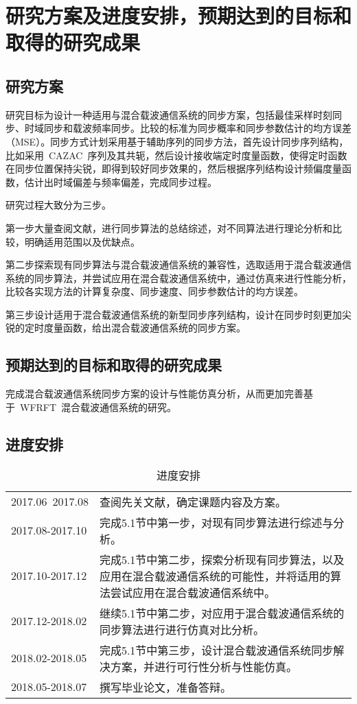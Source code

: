 
\section{研究方案及进度安排，预期达到的目标和取得的研究成果}
\subsection{研究方案}
研究目标为设计一种适用与混合载波通信系统的同步方案，包括最佳采样时刻同步、时域同步和载波频率同步。比较的标准为同步概率和同步参数估计的均方误差（MSE）。同步方式计划采用基于辅助序列的同步方法，首先设计同步序列结构，比如采用~CAZAC~序列及其共轭，然后设计接收端定时度量函数，使得定时函数在同步位置保持尖锐，即得到较好同步效果的，然后根据序列结构设计频偏度量函数，估计出时域偏差与频率偏差，完成同步过程。

研究过程大致分为三步。

第一步大量查阅文献，进行同步算法的总结综述，对不同算法进行理论分析和比较，明确适用范围以及优缺点。

第二步探索现有同步算法与混合载波通信系统的兼容性，选取适用于混合载波通信系统的同步算法，并尝试应用在混合载波通信系统中，通过仿真来进行性能分析，比较各实现方法的计算复杂度、同步速度、同步参数估计的均方误差。

第三步设计适用于混合载波通信系统的新型同步序列结构，设计在同步时刻更加尖锐的定时度量函数，给出混合载波通信系统的同步方案。

\subsection{预期达到的目标和取得的研究成果}
完成混合载波通信系统同步方案的设计与性能仿真分析，从而更加完善基于~WFRFT~混合载波通信系统的研究。

\subsection{进度安排}
\begin{table}[htbp]
\centering
\caption{进度安排}\label{table3}\vspace{-0.5em}
\begin{tabularx}{0.8\textwidth}{lX}
\toprule
2017.06~2017.08 & 查阅先关文献，确定课题内容及方案。\\
2017.08-2017.10 & 完成5.1节中第一步，对现有同步算法进行综述与分析。\\
2017.10-2017.12	& 完成5.1节中第二步，探索分析现有同步算法，以及应用在混合载波通信系统的可能性，并将适用的算法尝试应用在混合载波通信系统中。\\
2017.12-2018.02 & 继续5.1节中第二步，对应用于混合载波通信系统的同步算法进行进行仿真对比分析。\\
2018.02-2018.05 & 完成5.1节中第三步，设计混合载波通信系统同步解决方案，并进行可行性分析与性能仿真。\\
2018.05-2018.07 & 撰写毕业论文，准备答辩。\\
\bottomrule
\end{tabularx}
\end{table}


